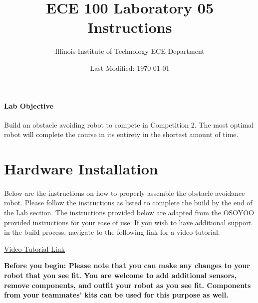 \documentclass{article}
\title{ECE 100 Laboratory 05 Instructions }
\author{Illinois Institute of Technology ECE Department}
\date{Last Modified: \today}
\begin{document}
	\maketitle
	
	\paragraph{Lab Objective} Build an obstacle avoiding robot to compete in Competition 2. The most optimal robot will complete the course in its entirety in the shortest amount of time. 
	
	
\section{Hardware Installation}
	\paragraph{} Below are the instructions on how to properly assemble the obstacle avoidance robot. Please follow the instructions as listed to complete the build by the end of the Lab section. The instructions provided below are adapted from the OSOYOO provided instructions for your ease of use. If you wish to have additional support in the build process, navigate to the following link for a video tutorial. 
\vspace{1em}
 
	\href{https://osoyoo.com/2020/05/12/osoyoo-v2-1-robot-car-kit-lesson-4-tracking-line-robot-car/}{Video Tutorial Link}
\vspace{1em}

\textbf{Before you begin: Please note that you can make any changes to your robot that you see fit. You are welcome to add additional sensors, remove components, and outfit your robot as you see fit. Components from your teammates’ kits can be used for this purpose as well.}
\end{document}
